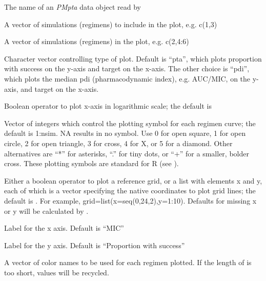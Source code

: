 \documentclass[a4paper]{book}
\begin{document}
\begin{Arguments}
\begin{ldescription}
\item[\code{x}] The name of an \emph{PMpta} data object read by 

\item[\code{include}] A vector of simulations (regimens) to include in the plot, e.g. c(1,3)

\item[\code{exclude}] A vector of simulations (regimens) in the plot, e.g. c(2,4:6)

\item[\code{plot.type}] Character vector controlling type of plot.
Default is ``pta'', which plots proportion with success on the y-axis and target on the x-axis.
The other choice is ``pdi'', which plots the median pdi (pharmacodynamic index), e.g. AUC/MIC, on the
y-axis, and target on the x-axis.

\item[\code{log}] Boolean operator to plot x-axis in logarithmic scale; the default is 

\item[\code{pch}] Vector of integers which control the plotting symbol for each regimen curve; the default is 1:nsim.  NA results in no symbol.
Use 0 for open square, 1 for open circle, 2 for open triangle, 3 for cross, 4 for X, or 5 for a diamond.
Other alternatives are ``*'' for asterisks, ``.'' for tiny dots, or ``+'' for a smaller,
bolder cross.  These plotting symbols are standard for R (see ).

\item[\code{grid}] Either a boolean operator to plot a reference grid, or a list with elements x and y,
each of which is a vector specifying the native coordinates to plot grid lines; the default is .
For example, grid=list(x=seq(0,24,2),y=1:10).  Defaults for missing x or y will be calculated by .

\item[\code{xlab}] Label for the x axis.  Default is ``MIC''

\item[\code{ylab}] Label for the y axis.  Default is ``Proportion with success''

\item[\code{col}] A vector of color names to be used for each regimen plotted.  If the
length of  is too short, values will be recycled.


\end{ldescription}
\end{Arguments}
\end{document}
